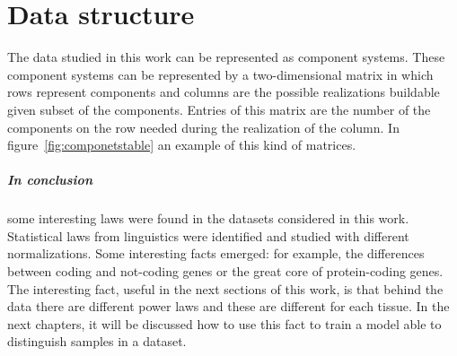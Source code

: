 \chapter{Data structure}\label{ch:structure}
The data studied in this work can be represented as component systems. These component systems can be represented by a two-dimensional matrix in which rows represent components and columns are the possible realizations buildable given subset of the components. Entries of this matrix are the number of the components on the row needed during the realization of the column. In figure~\ref{fig:componetstable} an example of this kind of matrices.







\FloatBarrier


\paragraph{In conclusion} some interesting laws were found in the datasets considered in this work. Statistical laws from linguistics were identified and studied with different normalizations. Some interesting facts emerged: for example, the differences between coding and not-coding genes or the great core of protein-coding genes. The interesting fact, useful in the next sections of this work, is that behind the data there are different power laws and these are different for each tissue. In the next chapters, it will be discussed how to use this fact to train a model able to distinguish samples in a dataset. 